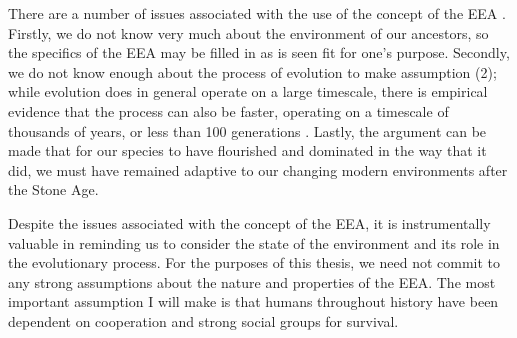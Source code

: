 There are a number of issues associated with the use of the concept of the EEA \citep{LB02}. Firstly, we do not know very much about the environment of our ancestors, so the specifics of the EEA may be filled in as is seen fit for one's purpose. Secondly, we do not know enough about the process of evolution to make assumption (2); while evolution does in general operate on a large timescale, there is empirical evidence
that the process can also be faster, operating on a timescale of thousands of years, or less than 100 generations \citep[pp.~190--191 and references therein]{LB02}. Lastly, the argument can be made that for our species to have flourished and dominated in the way that it did, we must have remained adaptive to our changing modern environments after the Stone Age.

Despite the issues associated with the concept of the EEA, it is instrumentally valuable in reminding us to consider the state of the environment and its role in the evolutionary process. For the purposes of this thesis, we need not commit to any strong assumptions about the nature and properties of the EEA. The most important assumption I will make  is that humans throughout history have been dependent on cooperation and strong social groups for survival.

